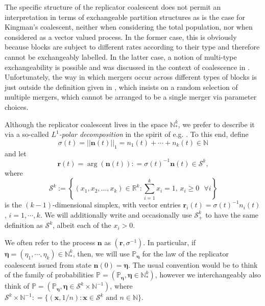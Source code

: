 \documentclass[12pt, leqno]{article}
\newcommand*{\norm}[1]{\lVert #1 \rVert}
\begin{document}
\medskip
The specific structure of the replicator coalescent does not permit an interpretation in terms of exchangeable partition structures as is the case for Kingman's coalescent, neither when considering the total population, nor when considered as a vector valued process. In the former case, this is obviously because blocks are subject to different rates according to their type and therefore cannot be exchangeably labelled. In the latter case, a notion of multi-type exchangeability is possible and was discussed in the context of coalescence in \cite{JKR}. Unfortunately, the way in which mergers  occur across different types of blocks is just outside the definition given in \cite{JKR}, which insists on a random selection of multiple mergers, which cannot be arranged to be a single merger via parameter choices.

\medskip

Although the replicator coalescent lives in the space $\mathbb{N}^k_*$, we prefer to describe it via a so-called
{\it $L^1$-polar decomposition} in the spirit of e.g. \cite{BEG}. To this end,  define 
\[
\sigma(t) = ||\bm n(t)||_1 = n_1(t)+\cdots+n_k(t)\in \mathbb{N}
\]
 and let 
 \[
 \bm  r(t) = \arg(\bm n(t)): = \sigma(t)^{-1}\bm{n}(t)\in\mathcal{S}^k,
 \]
  where 
  \[
  \mathcal{S}^{k}:=\left\{ (x_1,x_2,...,x_{k})\in\mathbb{R}^k:\sum_{i=1}^{k}x_i=1 \mbox{, } x_i\geq0 \mbox{ }\forall i\right\}
  \]
   is the $(k-1)$-dimensional simplex, with vector entries $\bm{r}_i(t) = \sigma(t)^{-1}n_i(t)$, $i = 1,\cdots, k$. We will additionally write and occasionally use $ \mathcal{S}^{k}_+$ to have the same definition as $ \mathcal{S}^{k}$, albeit each of the $x_i>0$.

\medskip

We often refer to the process $\bm n$ as $( \bm r, \sigma^{-1})$. In particular, if $\bm\eta =(\eta_1,\cdots,\eta_k)\in \mathbb{N}^k_*$,  then, we will use %
$\mathbb{P}_{\bm\eta}$
 for the law of the replicator coalescent issued from state $\bm n(0) = \bm \eta$. The usual convention would be to think of  the family of probabilities  $\mathbb{P}= (\mathbb{P}_{\bm\eta}, \bm\eta\in \mathbb{N}^k_*)$, however we interchangeably also think of $\mathbb{P}= (\mathbb{P}_{\bm\eta}, \bm\eta\in \mathcal{S}^k\times \mathbb{N}^{-1})$, where $\mathcal{S}^k\times \mathbb{N}^{-1}: = \{(\bm x, 1/n): \bm x\in \mathcal{S}^k\text{ and }n\in \mathbb{N}\}$.
 
\end{document}
